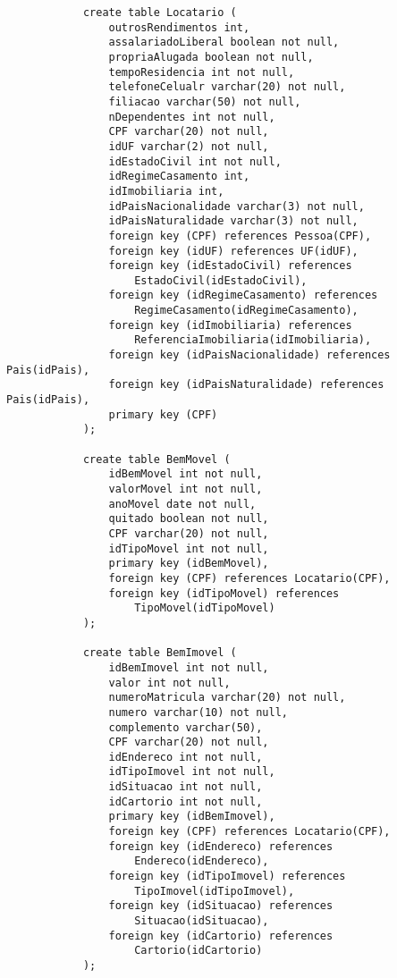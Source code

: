 \documentclass{article}
\begin{document}
\begin{lstlisting}
            create table Locatario (
            	outrosRendimentos int,
            	assalariadoLiberal boolean not null,
            	propriaAlugada boolean not null,
            	tempoResidencia int not null,
            	telefoneCelualr varchar(20) not null,
            	filiacao varchar(50) not null,
            	nDependentes int not null,
            	CPF varchar(20) not null,
            	idUF varchar(2) not null,
            	idEstadoCivil int not null,
            	idRegimeCasamento int,
            	idImobiliaria int,
            	idPaisNacionalidade varchar(3) not null,
            	idPaisNaturalidade varchar(3) not null,
            	foreign key (CPF) references Pessoa(CPF),
            	foreign key (idUF) references UF(idUF),
            	foreign key (idEstadoCivil) references 
            	    EstadoCivil(idEstadoCivil),
            	foreign key (idRegimeCasamento) references 
            	    RegimeCasamento(idRegimeCasamento),
            	foreign key (idImobiliaria) references 
            	    ReferenciaImobiliaria(idImobiliaria),
            	foreign key (idPaisNacionalidade) references Pais(idPais),
            	foreign key (idPaisNaturalidade) references Pais(idPais),
            	primary key (CPF)
            );
            
            create table BemMovel (
            	idBemMovel int not null,
            	valorMovel int not null,
            	anoMovel date not null,
            	quitado boolean not null,
            	CPF varchar(20) not null,
            	idTipoMovel int not null,
            	primary key (idBemMovel),
            	foreign key (CPF) references Locatario(CPF),
            	foreign key (idTipoMovel) references 
            	    TipoMovel(idTipoMovel)
            );
            
            create table BemImovel (
            	idBemImovel int not null,
            	valor int not null, 
            	numeroMatricula varchar(20) not null,
            	numero varchar(10) not null,
            	complemento varchar(50),
            	CPF varchar(20) not null,
            	idEndereco int not null,
            	idTipoImovel int not null,
            	idSituacao int not null,
            	idCartorio int not null,
            	primary key (idBemImovel),
            	foreign key (CPF) references Locatario(CPF),
            	foreign key (idEndereco) references 
            	    Endereco(idEndereco),
            	foreign key (idTipoImovel) references 
            	    TipoImovel(idTipoImovel),
            	foreign key (idSituacao) references 
            	    Situacao(idSituacao),
            	foreign key (idCartorio) references 
            	    Cartorio(idCartorio)
            );
            

\end{lstlisting}
\end{document}
